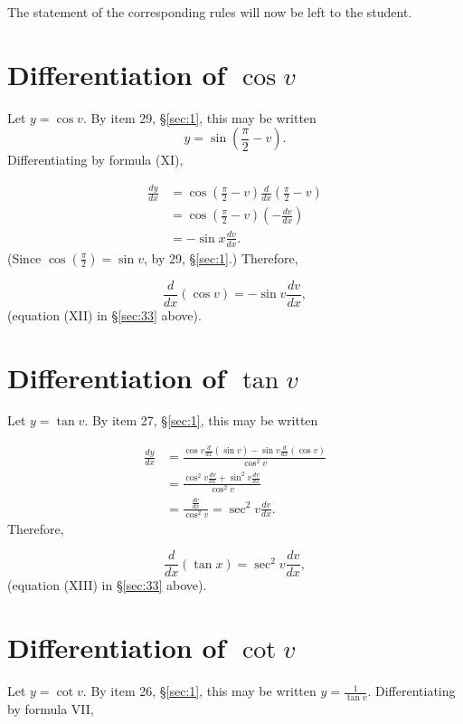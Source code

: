 The statement of the corresponding rules will now be left to the student.

\section{Differentiation of $\cos v$}

Let $y 	= \cos v$.
By item 29, \S \ref{sec:1}, %
this may be written
\[
  	y 	= \sin \left ( \frac{\pi}{2} - v \right ).
\]
Differentiating by formula (XI),

\[
\begin{array}{ll}
  \frac{dy}{dx} 
& = \cos \left ( \frac{\pi}{2} - v \right ) \frac{d}{dx} \left ( \frac{\pi}{2} - v \right )\\
& = \cos \left ( \frac{\pi}{2} - v \right ) \left ( -\frac{dv}{dx} \right )\\
& = -\sin x \frac{dv}{dx}.
\end{array}
\]
(Since $\cos \left ( \frac{\pi}{2} \right ) = \sin v$, by 29, \S \ref{sec:1}.) %
Therefore, 

\[
\frac{d}{dx} (\cos v) 	= -\sin v \frac{dv}{dx},
\]
(equation (XII) in \S \ref{sec:33}  above).

\section{Differentiation of $\tan v$}

Let $y 	= \tan v$.
By item 27, \S \ref{sec:1}, %
this may be written

\[
\begin{array}{ll}
  	\frac{dy}{dx}
& 	= \frac{\cos v \frac{d}{dx}(\sin v) - \sin v \frac{d}{dx}(\cos v)}{\cos^2 v}\\
 & 	= \frac{\cos^2 v \frac{dv}{dx} + \sin^2 v \frac{dv}{dx}}{\cos^2 v}\\
 & 	= \frac{\frac{dv}{dx}}{\cos^2 v} = \sec^2 v \frac{dv}{dx}.
\end{array}
\]
Therefore, 

\[
\frac{d}{dx}(\tan x) 	= \sec^2 v \frac{dv}{dx},
\]
(equation (XIII) in \S \ref{sec:33}  above).


\section{Differentiation of $\cot v$}

Let $y 	= \cot v$.
By item 26, \S \ref{sec:1}, %
this may be written $y 	= \frac{1}{\tan v}$.
Differentiating by formula VII,

